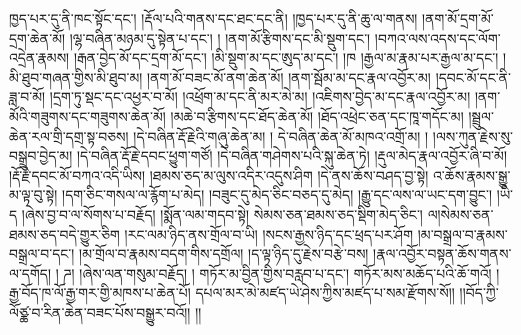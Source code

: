 ཁྱད་པར་དུ་ནི་ཁང་སྟོང་དང་། །རྡོལ་པའི་གནས་དང་ཐང་དང་ནི། །ཁྱད་པར་དུ་ནི་ཆུ་ལ་གནས། །ནག་མོ་དྲག་མོ་དྲག་ཆེན་མོ། །ལྷ་བཞིན་མཉམ་དུ་སྟེན་པ་དང་། ། །ནག་མོ་རྩིགས་དང་མི་སྡུག་དང་། །བཀའ་ལས་འདས་དང་ལོག་འདྲེན་རྣམས། །རྒན་བྱེད་མོ་དང་དྲག་མོ་དང་། །མི་སྡུག་མ་དང་ཨུད་མ་དང་། །ཁ །རྒྱལ་མ་རྣམ་པར་རྒྱལ་མ་དང་། །མི་ཐུབ་གཞན་གྱིས་མི་ཐུབ་མ། །ནག་མོ་བཟང་མོ་ནག་ཆེན་མོ།  །ནག་སྦོམ་མ་དང་རྣལ་འབྱོར་མ། །དབང་མོ་དང་ནི་ཟླ་བ་མོ། །དྲག་ཏུ་སྡང་དང་འཕྱར་བ་མོ། །འཕྲོག་མ་དང་ནི་མར་མེ་མ། །འཇིགས་བྱེད་མ་དང་རྣལ་འབྱོར་མ། །ནག་མོའི་གཟུགས་དང་གཟུགས་ཆེན་མོ། །མཆེ་བ་རྩིགས་དང་ཐོད་ཆེན་མོ། །ཐོད་འཕྲེང་ཅན་དང་ཁཱ་གདོང་མ། །སྦྲུལ་ཆེན་རལ་གྲི་དགྲ་སྟ་བཅས། །དེ་བཞིན་རྡོ་རྗེའི་གཞུ་ཆེན་མ། །
དེ་བཞིན་ཆེན་མོ་མཁའ་འགྲོ་མ། ། །ལས་ཀུན་རྗེས་སུ་བསྒྲུབ་བྱེད་མ། །དེ་བཞིན་རྡོ་རྗེ་དབང་ཕྱུག་གཙོ། །དེ་བཞིན་གཤེགས་པའི་སྐུ་ཆེན་ཏེ། །རྡུལ་མེད་རྣལ་འབྱོར་ཞི་བ་མོ། །རྡོ་རྗེ་དབང་མོ་བཀའ་འདི་ཡིས། །ཐམས་ཅད་མ་ལུས་འདིར་འདུས་ཤིག །དེ་ནས་ཆོས་བཤད་བྱ་སྟེ། འ་ཆོས་རྣམས་སྒྱུ་མ་ལྟ་བུ་སྟེ། །དག་ཅིང་གསལ་ལ་རྙོག་པ་མེད། །བཟུང་དུ་མེད་ཅིང་བཅད་དུ་མེད། །རྒྱུ་དང་ལས་ལ་ཡང་དག་བྱུང་། །ཡི་ད །ཞེས་བྱ་བ་ལ་སོགས་པ་བརྗོད། །སྨོན་ལམ་གདབ་སྟེ། སེམས་ཅན་ཐམས་ཅད་སྡིག་མེད་ཅིང་། ལ།སེམས་ཅན་ཐམས་ཅད་བདེ་གྱུར་ཅིག །རང་ལམ་ཉིད་ནས་གྲོལ་བ་ཡི། །སངས་རྒྱས་ཉིད་དང་ཕྲད་པར་ཤོག །མ་བསྒྲལ་བ་རྣམས་བསྒྲལ་བ་དང་། །མ་གྲོལ་བ་རྣམས་བདག་གིས་དགྲོལ། །ད་ལྟ་ཉིད་དུ་རྗེས་བརྩེ་བས། །རྣལ་འབྱོར་བསྟན་ཆོས་གནས་ལ་དགོད། ། ཌ། །ཞེས་ལན་གསུམ་བརྗོད། ། གཏོར་མ་བྱིན་གྱིས་བརླབ་པ་དང་། གཏོར་མས་མཆོད་པའི་ཆོ་གའོ། ། རྒྱ་བོད་ཁ་ལོ་རྒྱ་གར་གྱི་མཁས་པ་ཆེན་པོ། དཔལ་མར་མེ་མཛད་ཡེ་ཤེས་ཀྱིས་མཛད་པ་སམ་རྫོགས་སོ།། །།བོད་ཀྱི་ལོཙྪ་བ་རིན་ཆེན་བཟང་པོས་བསྒྱུར་བའོ།། །།
